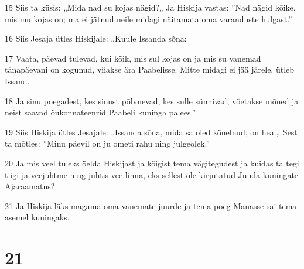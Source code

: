 \par 15 Siis ta küsis: „Mida nad su kojas nägid?„ Ja Hiskija vastas: ”Nad nägid kõike, mis mu kojas on; ma ei jätnud neile midagi näitamata oma varanduste hulgast.”
\par 16 Siis Jesaja ütles Hiskijale: „Kuule Issanda sõna:
\par 17 Vaata, päevad tulevad, kui kõik, mis sul kojas on ja mis su vanemad tänapäevani on kogunud, viiakse ära Paabelisse. Mitte midagi ei jää järele, ütleb Issand.
\par 18 Ja sinu poegadest, kes sinust põlvnevad, kes sulle sünnivad, võetakse mõned ja neist saavad õukonnateenrid Paabeli kuninga palees.”
\par 19 Siis Hiskija ütles Jesajale: „Issanda sõna, mida sa oled kõnelnud, on hea.„ Sest ta mõtles: ”Minu päevil on ju ometi rahu ning julgeolek.”
\par 20 Ja mis veel tuleks öelda Hiskijast ja kõigist tema vägitegudest ja kuidas ta tegi tiigi ja veejuhtme ning juhtis vee linna, eks sellest ole kirjutatud Juuda kuningate Ajaraamatus?
\par 21 Ja Hiskija läks magama oma vanemate juurde ja tema poeg Manasse sai tema asemel kuningaks.

\chapter{21}

